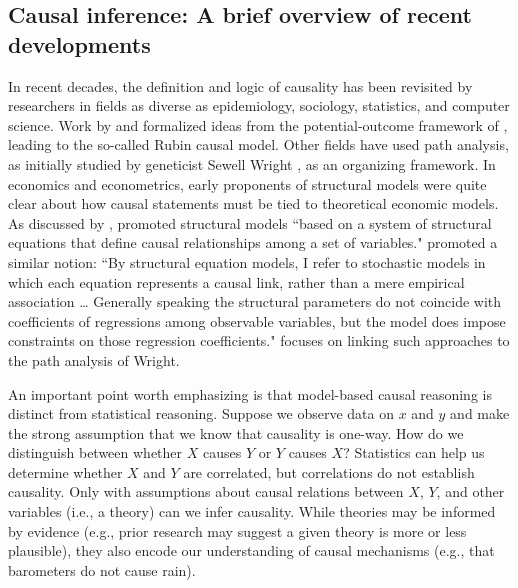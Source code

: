 \documentclass[12pt,reqno,titlepage]{amsart}
\theoremstyle{definition}
\begin{document}
\begin{doublespace}
\subsection{Causal inference: A brief overview of recent developments}
In recent decades, the definition and logic of causality has been revisited by researchers in fields as diverse as epidemiology, sociology, statistics, and computer science. 
Work by \citet{Rubin:1974im,Rubin:1977dv} and \citet{Holland:1986p7458} formalized ideas from the potential-outcome framework of \citet{Neyman:1923aa}, leading to the so-called Rubin causal model. 
Other fields have used path analysis, as initially studied by geneticist Sewell Wright \citep{Wright:1921aa}, as an organizing framework.
In economics and econometrics, early proponents of structural models were quite clear about how causal statements must be tied to theoretical economic models.
As discussed by \citet{Heckman:2015ez}, \citet{Haavelmo:1943cl,Haavelmo:1944jq} promoted structural models ``based on a system of structural equations that define causal relationships among a set of variables."
\citet[p.\,979]{Goldberger:1972cq} promoted a similar notion: 
``By structural equation models, I refer to stochastic models in which each equation represents a causal link, rather than a mere empirical association \dots
Generally speaking the structural parameters do not coincide with coefficients of regressions among observable variables, but the model does impose constraints on those regression coefficients."
\citet{Goldberger:1972cq} focuses on linking such approaches to the path analysis of Wright.

An important point worth emphasizing is that model-based causal reasoning is distinct from statistical reasoning. 
Suppose we observe data on $x$ and $y$ and make the strong assumption that we know that causality is one-way. 
How do we distinguish between whether $X$ causes $Y$ or $Y$ causes $X$? 
Statistics can help us determine whether $X$ and $Y$ are correlated, but correlations do not establish causality.
Only with assumptions about causal relations between $X$, $Y$, and other variables (i.e., a theory) can we infer causality.
While theories may be informed by evidence (e.g., prior research may suggest a given theory is more or less plausible), they also encode our understanding of causal mechanisms (e.g., that barometers do not cause rain).



\end{doublespace}
\end{document}
